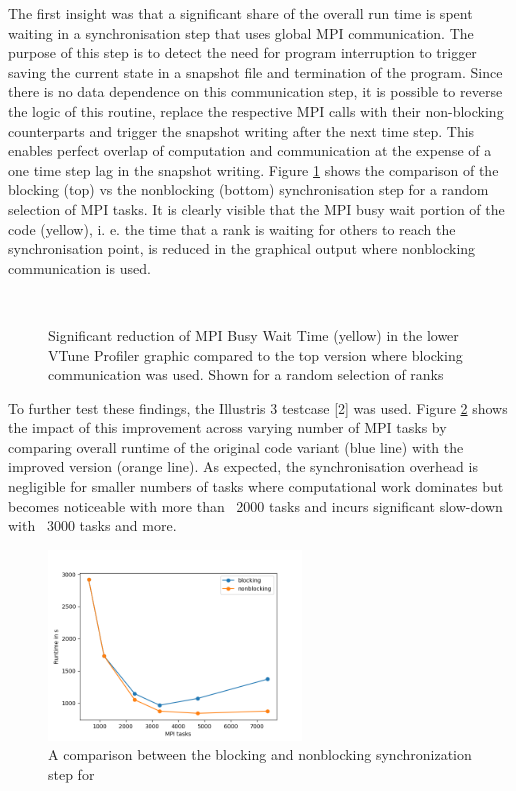 \documentclass[../main]{subfiles}
\begin{document}
The first insight was that a significant share of the overall run time is spent waiting in a synchronisation step that uses global MPI communication.
The purpose of this step is to detect the need for program interruption to trigger saving the current state in a snapshot file and termination of the program.
Since there is no data dependence on this communication step, it is possible to reverse the logic of this routine, replace the respective MPI calls with their non-blocking counterparts and trigger the snapshot writing after the next time step.
This enables perfect overlap of computation and communication at the expense of a one time step lag in the snapshot writing.
Figure \ref{fig:arepo_mpicom} shows the comparison of the blocking (top) vs the nonblocking (bottom) synchronisation step for a random selection of MPI tasks. It is clearly visible that the MPI busy wait portion of the code (yellow), i. e.  the time that a rank is waiting for others to reach the synchronisation point, is reduced in the graphical output where nonblocking communication is used. 

\begin{figure}[htp]
	\centering
	\\
	\caption{Significant reduction of MPI Busy Wait Time (yellow) in the lower VTune Profiler graphic compared to the top version where blocking communication was used. Shown for a random selection of ranks}
	\label{fig:arepo_mpicom} %
\end{figure}
To further test these findings, the Illustris 3 testcase [2] was used. Figure \ref{fig:arepo_blockvsnonblock} shows the impact of this improvement across varying number of MPI tasks by comparing overall runtime of the original code variant (blue line) with the improved version (orange line). As expected, the synchronisation overhead is negligible for smaller numbers of tasks where computational work dominates but becomes noticeable with more than ~2000 tasks and incurs significant slow-down with ~3000 tasks and more.  
\begin{figure}[htp]
	\centering
	\includegraphics[clip,width=0.6\textwidth]{images/Arepo_blockingvsNonblocking.png}
	\caption{A comparison between the blocking and nonblocking synchronization step for }
	\label{fig:arepo_blockvsnonblock} %
\end{figure}
\end{document}
